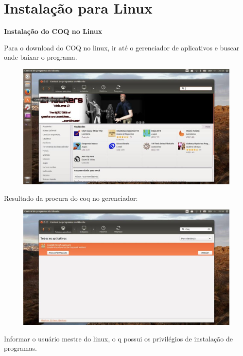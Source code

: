 \section{Instala\c{c}\~ao para Linux}
\begin{center}
{\textbf {Instala\c{c}\~{a}o do COQ no Linux }}\\
\end{center}
Para o download do COQ  no linux, ir at\'{e} o gerenciador de aplicativos e buscar onde baixar o programa.\\
\begin{figure}[!htb]
\includegraphics[scale=0.4]{imagens/linux5.jpg}
\end{figure}
Resultado da procura do coq no gerenciador:\\
\begin{figure}[!htb]
\includegraphics[scale=0.4]{imagens/linux2.jpg}
\end{figure}
Informar o usu\'{a}rio mestre do linux, o q possui os privil\'{e}gios de instala\c{c}\~{a}o de programas.\\
